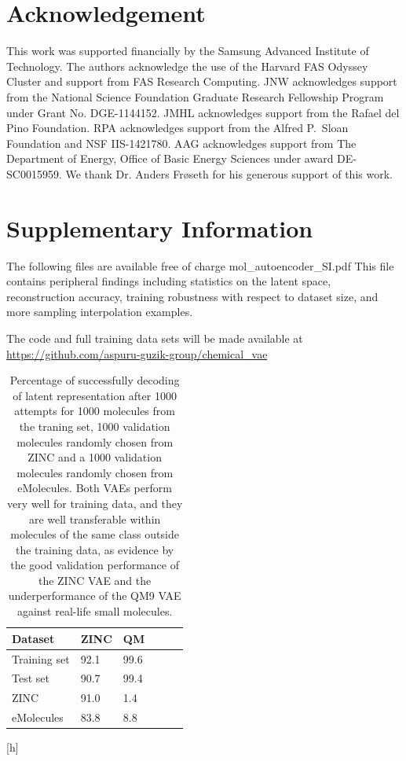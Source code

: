 \section{Acknowledgement}

This work was supported financially by the Samsung Advanced Institute of Technology.
The authors acknowledge the use of the Harvard FAS Odyssey Cluster and support from FAS Research Computing.
JNW acknowledges support from the National Science Foundation Graduate Research Fellowship Program under Grant No. DGE-1144152.
JMHL acknowledges support from the Rafael del Pino Foundation. RPA acknowledges support from the Alfred P.\ Sloan Foundation and NSF IIS-1421780. AAG acknowledges support from The Department of Energy, Office of Basic Energy Sciences under award DE-SC0015959.
We thank Dr. Anders Fr\o seth for his generous support of this work.


\section{Supplementary Information}
The following files are available free of charge  mol\_autoencoder\_SI.pdf
This file contains peripheral findings including statistics on the latent space, reconstruction accuracy, training robustness with respect to dataset size, and more sampling interpolation examples.

The code and full training data sets will be made available at \url{https://github.com/aspuru-guzik-group/chemical_vae}


\begin{table}[h]
\centering
\begin{tabular}{lp{1cm}lp{1cm}lp{1cm}}
\hline
Dataset & ZINC & QM \\
\hline
Training set & 92.1 & 99.6 \\
\hline
Test set & 90.7 & 99.4 \\
\hline
ZINC & 91.0 & 1.4 \\
\hline
eMolecules & 83.8 & 8.8 \\
\hline
\end{tabular}
\caption{Percentage of successfully decoding of latent representation after 1000 attempts for 1000 molecules from the traning set, 1000 validation molecules randomly chosen from ZINC and a 1000 validation molecules randomly chosen from eMolecules. Both VAEs perform very well for training data, and they are well transferable within molecules of the same class outside the training data, as evidence by the good validation performance of the ZINC VAE and the underperformance of the QM9 VAE against real-life small molecules.}
\label{tab:recovery statistics}
\end{table}[h]

